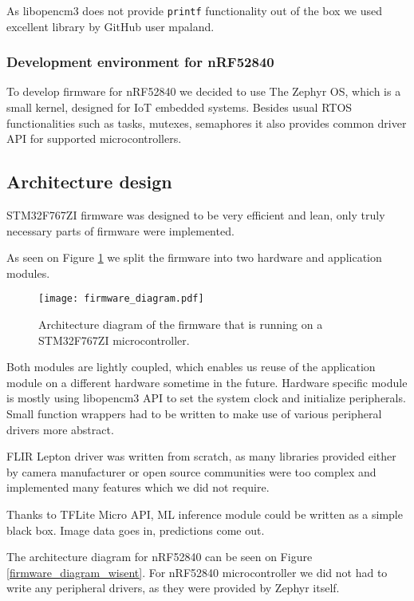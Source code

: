 As libopencm3 does not provide \verb|printf| functionality out of the box we used excellent library by GitHub user mpaland\cite{printf_lib}.


\subsubsection{ Development environment for nRF52840}

To develop firmware for nRF52840 we decided to use The Zephyr OS, which is a small kernel, designed for IoT embedded systems.
Besides usual RTOS functionalities such as tasks, mutexes, semaphores it also provides common driver API for supported microcontrollers.


\subsection{ Architecture design}

STM32F767ZI firmware was designed to be very efficient and lean, only truly necessary parts of firmware were implemented.

As seen on Figure \ref{firmware_diagram} we split the firmware into two hardware and application modules.

\begin{figure}[ht]
        \centering
        \texttt{[image: firmware\_diagram.pdf]} 
        \caption{ Architecture diagram of the firmware that is running on a STM32F767ZI microcontroller.} 
        \label{firmware_diagram}
\end{figure}

Both modules are lightly coupled, which enables us reuse of the application module on a different hardware sometime in the future.
Hardware specific module is mostly using libopencm3 API to set the system clock and initialize peripherals.
Small function wrappers had to be written to make use of various peripheral drivers more abstract.

FLIR Lepton driver was written from scratch, as many libraries provided either by camera manufacturer or open source communities were too complex and implemented many features which we did not require.

Thanks to TFLite Micro API, ML inference module could be written as a simple black box.
Image data goes in, predictions come out.

The architecture diagram for nRF52840 can be seen on Figure \ref{firmware_diagram_wisent}.
For nRF52840 microcontroller we did not had to write any peripheral drivers, as they were provided by Zephyr itself.

